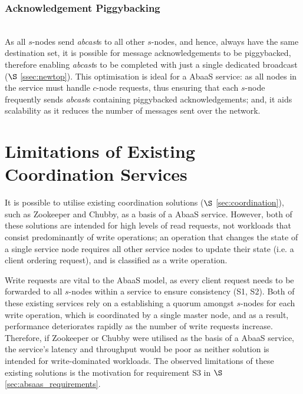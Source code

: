 		\subsubsection{Acknowledgement Piggybacking} \hspace{0pt} \\
		As all $s$-nodes send \emph{abcast}s to all other $s$-nodes, and hence, always have the same destination set, it is possible for message acknowledgements to be piggybacked, therefore enabling \emph{abcast}s to be completed with just a single dedicated broadcast ($\S$ \ref{ssec:newtop}).  This optimisation is ideal for a \textsf{AbaaS} service: as all nodes in the service must handle $c$-node requests, thus ensuring that each $s$-node frequently sends \emph{abcast}s containing piggybacked acknowledgements; and, it aids scalability as it reduces the number of messages sent over the network. 	
	
\section{Limitations of Existing Coordination Services}\label{sec:limitations_existing_coordination}
It is possible to utilise existing coordination solutions ($\S$ \ref{sec:coordination}), such as Zookeeper\citep{Hunt:2010:ZWC:1855840.1855851} and Chubby\citep{Burrows:2006:CLS:1298455.1298487}, as a basis of a \textsf{AbaaS} service.  However, both of these solutions are intended for high levels of read requests, not workloads that consist predominantly of write operations; an operation that changes the state of a single service node requires all other service nodes to update their state (i.e. a client ordering request), and is classified as a write operation.  

Write requests are vital to the \textsf{AbaaS} model, as every client request needs to be forwarded to all $s$-nodes within a service to ensure consistency (S1, S2).  Both of these existing services rely on a establishing a quorum amongst $s$-nodes for each write operation, which is coordinated by a single master node, and as a result, performance deteriorates rapidly as the number of write requests increase.  Therefore, if Zookeeper or Chubby were utilised as the basis of a \textsf{AbaaS} service, the service's latency and throughput would be poor as neither solution is intended for write-dominated workloads.  The observed limitations of these existing solutions is the motivation for requirement S3 in $\S$ \ref{sec:absaas_requirements}.  	
	
